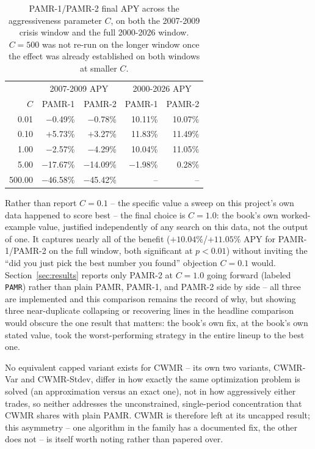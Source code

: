 \documentclass[11pt]{article}
\begin{document}
\begin{table}[h]
\centering
\begin{tabular}{rrrrr}
\toprule
& \multicolumn{2}{c}{2007-2009 APY} & \multicolumn{2}{c}{2000-2026 APY} \\
$C$ & PAMR-1 & PAMR-2 & PAMR-1 & PAMR-2 \\
\midrule
0.01  & $-$0.49\% & $-$0.78\% & 10.11\% & 10.07\% \\
0.10  & $+$5.73\% & $+$3.27\% & 11.83\% & 11.49\% \\
1.00  & $-$2.57\% & $-$4.29\% & 10.04\% & 11.05\% \\
5.00  & $-$17.67\% & $-$14.09\% & $-$1.98\% & 0.28\% \\
500.00 & $-$46.58\% & $-$45.42\% & -- & -- \\
\bottomrule
\end{tabular}
\caption{PAMR-1/PAMR-2 final APY across the aggressiveness parameter
$C$, on both the 2007-2009 crisis window and the full 2000-2026 window.
$C=500$ was not re-run on the longer window once the effect was already
established on both windows at smaller $C$.}
\label{tab:pamr-sweep}
\end{table}

Rather than report $C=0.1$ -- the specific value a sweep on this
project's own data happened to score best -- the final choice is
$C=1.0$: the book's own worked-example value, justified independently
of any search on this data, not the output of one. It captures nearly
all of the benefit ($+10.04\%$/$+11.05\%$ APY for PAMR-1/PAMR-2 on the
full window, both significant at $p<0.01$) without inviting the
``did you just pick the best number you found'' objection $C=0.1$
would. Section~\ref{sec:results} reports only PAMR-2 at $C=1.0$ going
forward (labeled \texttt{PAMR}) rather than plain PAMR, PAMR-1, and
PAMR-2 side by side -- all three are implemented and this comparison
remains the record of why, but showing three near-duplicate collapsing
or recovering lines in the headline comparison would obscure the one
result that matters: the book's own fix, at the book's own stated
value, took the worst-performing strategy in the entire lineup to the
best one.

No equivalent capped variant exists for CWMR -- its own two variants,
CWMR-Var and CWMR-Stdev, differ in how exactly the same optimization
problem is solved (an approximation versus an exact one), not in how
aggressively either trades, so neither addresses the unconstrained,
single-period concentration that CWMR shares with plain PAMR. CWMR is
therefore left at its uncapped result; this asymmetry -- one algorithm
in the family has a documented fix, the other does not -- is itself
worth noting rather than papered over.
\end{document}
